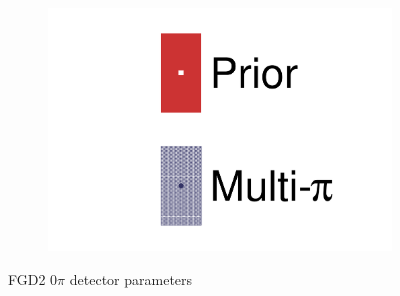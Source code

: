 \begin{figure}[h]
\begin{subfigure}[t]{0.32\textwidth}
		\includegraphics[width=\textwidth,page=38, trim={0mm 0mm 0mm 0mm}, clip]{figures/mach3/2018/data/2018a_FixedCov_RedCov_Mpi_Data_merge_drawPar_withDet}
	\end{subfigure}
	\caption{FGD2 0$\pi$ detector parameters}
	\label{fig:data_multipi_det_fdg2_cc0pi}
\end{figure}

